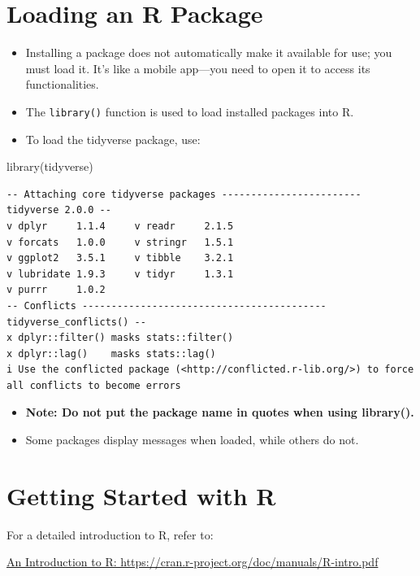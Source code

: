 \documentclass[
  letterpaper,
  DIV=11,
  numbers=noendperiod]{scrreprt}
\newenvironment{Shaded}{\begin{snugshade}}{\end{snugshade}}
\newcommand{\FunctionTok}[1]{\textcolor[rgb]{0.28,0.35,0.67}{#1}}
\newcommand{\NormalTok}[1]{\textcolor[rgb]{0.00,0.23,0.31}{#1}}
\begin{document}
\section{Loading an R Package}\label{loading-an-r-package}

\begin{itemize}
\item
  Installing a package does not automatically make it available for use;
  you must load it. It's like a mobile app---you need to open it to
  access its functionalities.
\item
  The \texttt{library()} function is used to load installed packages
  into R.
\item
  To load the tidyverse package, use:
\end{itemize}

\begin{Shaded}
\begin{Highlighting}[]
\FunctionTok{library}\NormalTok{(tidyverse)}
\end{Highlighting}
\end{Shaded}

\begin{verbatim}
-- Attaching core tidyverse packages ------------------------ tidyverse 2.0.0 --
v dplyr     1.1.4     v readr     2.1.5
v forcats   1.0.0     v stringr   1.5.1
v ggplot2   3.5.1     v tibble    3.2.1
v lubridate 1.9.3     v tidyr     1.3.1
v purrr     1.0.2     
-- Conflicts ------------------------------------------ tidyverse_conflicts() --
x dplyr::filter() masks stats::filter()
x dplyr::lag()    masks stats::lag()
i Use the conflicted package (<http://conflicted.r-lib.org/>) to force all conflicts to become errors
\end{verbatim}

\begin{itemize}
\item
  \textbf{Note: Do not put the package name in quotes when using
  library().}
\item
  Some packages display messages when loaded, while others do not.
\end{itemize}

\section{Getting Started with R}\label{getting-started-with-r}

For a detailed introduction to R, refer to:

\href{https://cran.r-project.org/doc/manuals/R-intro.pdf}{An
Introduction to R: https://cran.r-project.org/doc/manuals/R-intro.pdf}
\end{document}
